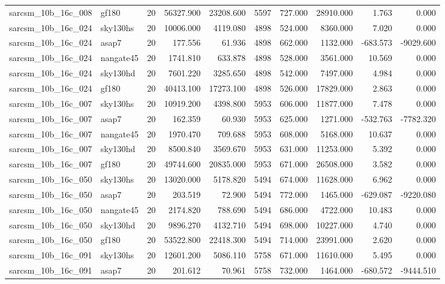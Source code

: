 \begin{longtable}{llrrrrrrrr}
sarcsm\_10b\_16c\_008 & gf180 & 20 & 56327.900 & 23208.600 & 5597 & 727.000 & 28910.000 & 1.763 & 0.000 \\
sarcsm\_10b\_16c\_024 & sky130hs & 20 & 10006.000 & 4119.080 & 4898 & 524.000 & 8360.000 & 7.020 & 0.000 \\
sarcsm\_10b\_16c\_024 & asap7 & 20 & 177.556 & 61.936 & 4898 & 662.000 & 1132.000 & -683.573 & -9029.600 \\
sarcsm\_10b\_16c\_024 & nangate45 & 20 & 1741.810 & 633.878 & 4898 & 528.000 & 3561.000 & 10.569 & 0.000 \\
sarcsm\_10b\_16c\_024 & sky130hd & 20 & 7601.220 & 3285.650 & 4898 & 542.000 & 7497.000 & 4.984 & 0.000 \\
sarcsm\_10b\_16c\_024 & gf180 & 20 & 40413.100 & 17273.100 & 4898 & 526.000 & 17829.000 & 2.863 & 0.000 \\
sarcsm\_10b\_16c\_007 & sky130hs & 20 & 10919.200 & 4398.800 & 5953 & 606.000 & 11877.000 & 7.478 & 0.000 \\
sarcsm\_10b\_16c\_007 & asap7 & 20 & 162.359 & 60.930 & 5953 & 625.000 & 1271.000 & -532.763 & -7782.320 \\
sarcsm\_10b\_16c\_007 & nangate45 & 20 & 1970.470 & 709.688 & 5953 & 608.000 & 5168.000 & 10.637 & 0.000 \\
sarcsm\_10b\_16c\_007 & sky130hd & 20 & 8500.840 & 3569.670 & 5953 & 631.000 & 11253.000 & 5.392 & 0.000 \\
sarcsm\_10b\_16c\_007 & gf180 & 20 & 49744.600 & 20835.000 & 5953 & 671.000 & 26508.000 & 3.582 & 0.000 \\
sarcsm\_10b\_16c\_050 & sky130hs & 20 & 13020.000 & 5178.820 & 5494 & 674.000 & 11628.000 & 6.962 & 0.000 \\
sarcsm\_10b\_16c\_050 & asap7 & 20 & 203.519 & 72.900 & 5494 & 772.000 & 1465.000 & -629.087 & -9220.080 \\
sarcsm\_10b\_16c\_050 & nangate45 & 20 & 2174.820 & 788.690 & 5494 & 686.000 & 4722.000 & 10.483 & 0.000 \\
sarcsm\_10b\_16c\_050 & sky130hd & 20 & 9896.270 & 4132.710 & 5494 & 698.000 & 10227.000 & 4.740 & 0.000 \\
sarcsm\_10b\_16c\_050 & gf180 & 20 & 53522.800 & 22418.300 & 5494 & 714.000 & 23991.000 & 2.620 & 0.000 \\
sarcsm\_10b\_16c\_091 & sky130hs & 20 & 12601.200 & 5086.110 & 5758 & 671.000 & 11610.000 & 5.495 & 0.000 \\
sarcsm\_10b\_16c\_091 & asap7 & 20 & 201.612 & 70.961 & 5758 & 732.000 & 1464.000 & -680.572 & -9444.510 \\

\end{longtable}
